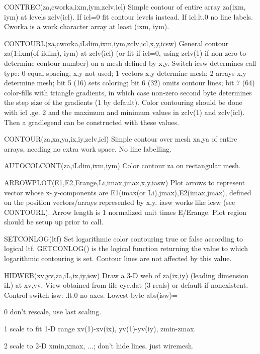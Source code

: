 
\iftth {}\fi

CONTREC(za,cworka,ixm,iym,zclv,icl) Simple contour of entire array za(ixm, iym)
at levels zclv(icl). If icl=0 fit contour levels instead. If icl.lt.0 no
line labels. Cworka is a work character array at least (ixm, iym).

CONTOURL(za,cworka,iLdim,ixm,iym,zclv,icl,x,y,icsw) General contour
za(1:ixm(of ildim), iym) at zclv(icl) (or fit if icl=0, using zclv(1)
if non-zero to determine contour number) on a mesh defined by
x,y. Switch icsw determines call type: 0 equal spacing, x,y not used;
1 vectors x,y determine mesh; 2 arrays x,y determine mesh; bit 5 (16)
sets coloring; bit 6 (32) omits contour lines; bit 7 (64) color-fills
with triangle gradients, in which case non-zero second byte determines
the step size of the gradients (1 by default). Color contouring should
be done with icl .ge. 2 and the maximum and minimum values in zclv(1)
and zclv(icl). Then a gradlegend can be constructed with these values.

CONTOUR(za,xa,ya,ix,iy,zclv,icl) Simple contour over mesh xa,ya of entire
arrays, needing no extra work space. No line labelling.

AUTOCOLCONT(za,iLdim,ixm,iym) Color contour za on rectangular mesh.

ARROWPLOT(E1,E2,Erange,Li,imax,jmax,x,y,iasw) Plot arrows to represent
vector whose x-,y-components are E1(imax(or Li),jmax),E2(imax,jmax),
defined on the position vectors/arrays represented by x,y. iasw works
like icsw (see CONTOURL). Arrow length is 1 normalized unit times
E/Erange. Plot region should be setup up prior to
call.

SETCONLOG(ltf) Set logarithmic color contouring true or false
according to logical ltf. GETCONLOG() is the logical function
returning the value to which logarithmic contouring is set. Contour
lines are not affected by this value.


\iftth {}\fi

HIDWEB(xv,yv,za,iL,ix,iy,isw) Draw a 3-D web of za(ix,iy) (leading
dimension iL) at xv,yv.  View obtained from file eye.dat (3 reals) or
default if nonexistent. Control switch isw: .lt.0 no axes.
Lowest byte abs(isw)=
\item{0} don't rescale, use last scaling.
\item{1} scale to fit 1-D range xv(1)-xv(ix), yv(1)-yv(iy), zmin-zmax.
\item{2} scale to 2-D xmin,xmax, ...; don't hide lines, just wiremesh. 

